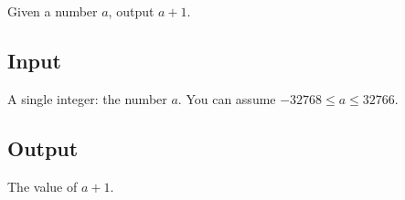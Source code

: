 Given a number $a$, output $a+1$.

\subsection*{Input}

A single integer: the number $a$.
You can assume $-32768\leq a\leq 32766$.

\subsection*{Output}

The value of $a+1$.
